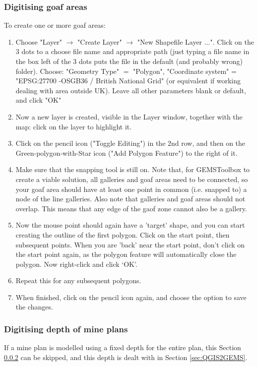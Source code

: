 \subsubsection{Digitising goaf areas}
\label{sec:digitising_goaf}
To create one or more goaf areas: 
\begin{enumerate}
    \item Choose "Layer" $\rightarrow$ "Create Layer" $\rightarrow$ "New Shapefile Layer ...". Click on the 3 dots to a choose file name and appropriate path (just typing a file name in the box left of the 3 dots puts the file in the default (and probably wrong) folder). Choose: "Geometry Type" $=$ "Polygon", "Coordinate system" = "EPSG:27700 -OSGB36 / British National Grid" (or equivalent if working dealing with area outside UK). Leave all other parameters blank or default, and click "OK"
    \item Now a new layer is created, visible in the Layer window, together with the map: click on the layer to highlight it. 
    \item Click on the pencil icon ("Toggle Editing") in the 2nd row, and then on the Green-polygon-with-Star icon ("Add Polygon Feature") to the right of it.
    \item Make sure that the snapping tool is still on. Note that, for GEMSToolbox to create a viable solution, all galleries and goaf areas need to be connected, so your goaf area should have at least one point in common (i.e. snapped to) a node of the line galleries. Also note that galleries and goaf areas should not overlap. This means that any edge of the gaof zone cannot also be a gallery.
    \item Now the mouse point should again have a 'target’ shape, and you can start creating the outline of the first polygon. Click on the start point, then subsequent points. When you are 'back' near the start point, don't click on the start point again, as the polygon feature will automatically close the polygon. Now right-click and click ‘OK’. \item Repeat this for any subsequent polygons. 
    \item When finished, click on the pencil icon again, and choose the option to save the changes.
\end{enumerate}

\subsubsection{Digitising depth of mine plans}
\label{sec:digitising_depth}
If a mine plan is modelled using a fixed depth for the entire plan, this Section \ref{sec:digitising_depth} can be skipped, and this depth is dealt with in Section \ref{sec:QGIS2GEMS}. 

